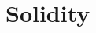 \documentclass[ManualeSviluppatore.tex]{subfiles}
\begin{document}
\chapter{Solidity}
\end{document}
